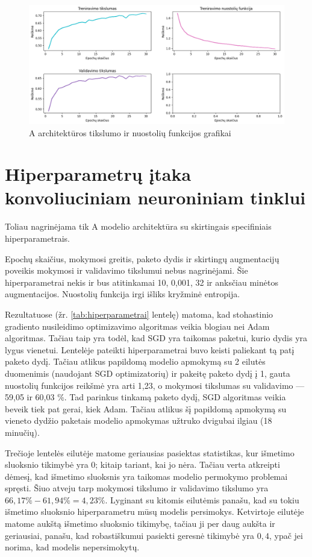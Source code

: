 \documentclass{VUMIFPSbakalaurinis}
\begin{document}
\begin{figure}[H]
  \centering
  \includegraphics[scale=0.5]{img/C.png}
  \caption{A architektūros tikslumo ir nuostolių funkcijos grafikai}
  \label{img:c-results}
\end{figure}


\section{Hiperparametrų įtaka konvoliuciniam neuroniniam tinklui}

Toliau nagrinėjama tik A modelio architektūra su skirtingais 
specifiniais hiperparametrais.

Epochų skaičius, mokymosi greitis, paketo dydis ir skirtingų
augmentacijų poveikis mokymosi ir validavimo tikslumui nebus nagrinėjami.
Šie hiperparametrai nekis ir bus atitinkamai 10, 0,001, 32 ir 
anksčiau minėtos augmentacijos. Nuostolių funkcija irgi išliks
kryžminė entropija.

Rezultatuose (žr. \ref{tab:hiperparametrai} lentelę) matoma, kad
stohastinio gradiento nusileidimo optimizavimo algoritmas veikia
blogiau nei Adam algoritmas. Tačiau taip yra todėl, kad SGD yra
taikomas paketui, kurio dydis yra lygus vienetui. Lentelėje pateikti
hiperparametrai buvo keisti paliekant tą patį paketo dydį. Tačiau atlikus
papildomą modelio apmokymą su 2 eilutės duomenimis (naudojant SGD optimizatorių)
ir pakeitę paketo dydį į 1, gauta nuostolių funkcijos reikšmė yra arti 1,23, o
mokymosi tikslumas su validavimo — 59,05 ir 60,03 \%. Tad parinkus tinkamą
paketo dydį, SGD algoritmas veikia beveik tiek pat gerai, kiek Adam. 
Tačiau atlikus šį papildomą apmokymą su vieneto dydžio paketais 
modelio apmokymas užtruko dvigubai ilgiau (18 minučių).

Trečioje lentelės eilutėje matome geriausias pasiektas statistikas,
kur išmetimo sluoksnio tikimybė yra 0; kitaip tariant, kai jo nėra. 
Tačiau verta atkreipti dėmesį, kad išmetimo sluoksnis yra taikomas
modelio permokymo problemai spręsti. Šiuo atveju tarp mokymosi tikslumo
ir validavimo tikslumo yra $66,17 \% - 61,94 \% = 4,23 \%$. Lyginant su kitomis
eilutėmis panašu, kad su tokiu išmetimo sluoksnio hiperparametru mūsų modelis
persimokys. Ketvirtoje eilutėje matome aukštą išmetimo sluoksnio tikimybę,
tačiau ji per daug aukšta ir geriausiai, panašu, kad robastiškumui pasiekti
geresnė tikimybė yra $0,4$, ypač jei norima, kad modelis nepersimokytų.
\end{document}
